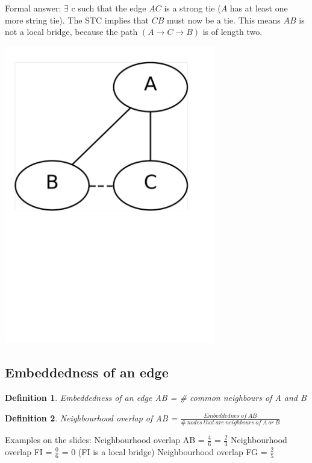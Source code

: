 \documentclass[12pt]{scrartcl}
\newtheorem{defi}{Definition}
\begin{document}
\begin{minipage}{0.5\textwidth}
	Formal answer: $\exists$ c such that the edge $AC$ is a strong tie ($A$ has at least one more string tie). The STC implies that $CB$ must now be a tie. This means $AB$ is not a local bridge, because the path $(A \rightarrow C \rightarrow B)$ is of length two.
\end{minipage} \hfill
\begin{minipage}{0.3\textwidth}	
	\includegraphics[width=0.69\textwidth]{./images/formal_proof_ties.pdf}
    \label{fig:formal_proof_ties}
\end{minipage}


\subsection{Embeddedness of an edge}
\begin{defi}
	Embeddedness of an edge AB = \# common neighbours of A and B
\end{defi}

\begin{defi}
	Neighbourhood overlap of AB = $\frac{Embeddednes\ of\ AB}{\#\ nodes\ that\ are\ neighbours\ of\ A\ or\ B}$
\end{defi}
\noindent Examples on the slides:\newline
Neighbourhood overlap AB = $\frac{4}{6}$ = $\frac{2}{3}$\newline
Neighbourhood overlap FI = $\frac{0}{6}$ = $0$ (FI is a local bridge)\newline
Neighbourhood overlap FG = $\frac{2}{5}$\newline
\end{document}
